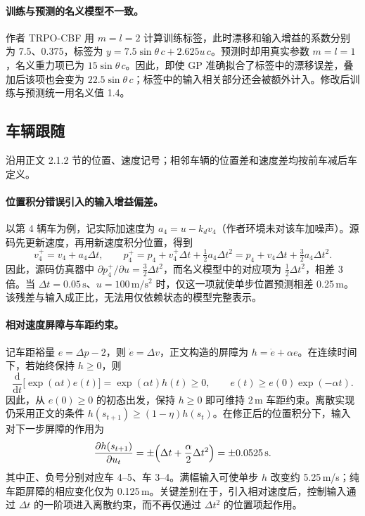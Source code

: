 \documentclass[UTF8,a4paper,zihao=-4,fontset=fandol]{ctexart}
\begin{document}
\paragraph{训练与预测的名义模型不一致。}
作者 TRPO-CBF 用 $m=l=2$ 计算训练标签，此时漂移和输入增益的系数分别为 7.5、0.375，标签为 $y=7.5\sin\theta\,c+2.625u\,c$。预测时却用真实参数 $m=l=1$，名义重力项已为 $15\sin\theta\,c$。因此，即使 GP 准确拟合了标签中的漂移误差，叠加后该项也会变为 $22.5\sin\theta\,c$；标签中的输入相关部分还会被额外计入。修改后训练与预测统一用名义值 1.4。

\subsection{车辆跟随}
\label{app:theory-car}
沿用正文 2.1.2 节的位置、速度记号；相邻车辆的位置差和速度差均按前车减后车定义。
\paragraph{位置积分错误引入的输入增益偏差。}
以第 4 辆车为例，记实际加速度为 $a_4=u-k_dv_4$（作者环境未对该车加噪声）。源码先更新速度，再用新速度积分位置，得到
\[
v_4^+=v_4+a_4\Delta t,\qquad
p_4^+=p_4+v_4^+\Delta t+\tfrac12a_4\Delta t^2
     =p_4+v_4\Delta t+\tfrac32a_4\Delta t^2.
\]
因此，源码仿真器中 $\partial p_4^+/\partial u=\tfrac32\Delta t^2$，而名义模型中的对应项为 $\tfrac12\Delta t^2$，相差 3 倍。当 $\Delta t=0.05\,\mathrm{s}$、$u=100\,\mathrm{m/s^2}$ 时，仅这一项就使单步位置预测相差 0.25\,m。该残差与输入成正比，无法用仅依赖状态的模型完整表示。

\paragraph{相对速度屏障与车距约束。}
记车距裕量 $e=\Delta p-2$，则 $\dot e=\Delta v$，正文构造的屏障为 $h=\dot e+\alpha e$。在连续时间下，若始终保持 $h\ge0$，则
\[
\frac{\mathrm d}{\mathrm dt}\bigl[\exp(\alpha t)e(t)\bigr]
=\exp(\alpha t)h(t)\ge0,
\qquad e(t)\ge e(0)\exp(-\alpha t).
\]
因此，从 $e(0)\ge0$ 的初态出发，保持 $h\ge0$ 即可维持 2\,m 车距约束。离散实现仍采用正文的条件 $h(s_{t+1})\ge(1-\eta)h(s_t)$。在修正后的位置积分下，输入对下一步屏障的作用为
\[
\frac{\partial h(s_{t+1})}{\partial u_t}
=\pm\Bigl(\Delta t+\frac{\alpha}{2}\Delta t^2\Bigr)
=\pm0.0525\,\mathrm{s}.
\]
其中正、负号分别对应车 4–5、车 3–4。满幅输入可使单步 $h$ 改变约 5.25\,m/s；纯车距屏障的相应变化仅为 0.125\,m。关键差别在于，引入相对速度后，控制输入通过 $\Delta t$ 的一阶项进入离散约束，而不再仅通过 $\Delta t^2$ 的位置项起作用。
\end{document}

